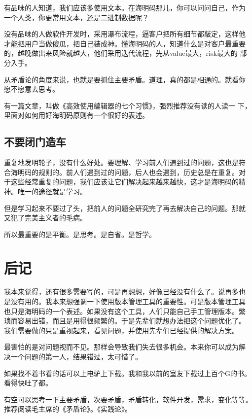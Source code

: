 \documentclass[10pt]{article}
\begin{document}
\begin{CJK*}{UTF8}{simsun}
有品味的人知道，我们应该多使用文本。在海明码那儿，你可以问问自己，作为
一个人类，你更常用文本，还是二进制数据呢？

没有品味的人做软件开发时，采用瀑布流程，逼客户把所有细节都敲定，这样他
才能把用户当做傻瓜，把自己装成神。懂海明码的人，知道什么是对客户最重要
的，越晚做出来风险就越大，他们采用迭代流程，先从value最大，risk最大的
部分入手。

从矛盾论的角度来说，也就是要抓住主要矛盾。道理，真的都是相通的。就看你
愿不愿意去思考。

有一篇文章，叫做《高效使用编辑器的七个习惯》，强烈推荐没有读的人读一
下，里面对如何用好海明码原则有一个很好的表述。

\subsection{不要闭门造车}

重复地发明轮子，没有什么好处。要理解、学习前人们遇到过的问题，这也是符
合海明码的规则的。前人们遇到过的问题，后人也会遇到，历史总是在重复。对
于这些经常重复的问题，我们应该让它们解决起来越来越快，这才是海明码的精
神。唯一的途径就是学习。

但是学习起来不要过了头，把前人的问题全研究完了再去解决自己的问题。那就
又犯了完美主义者的毛病。

所以最重要的是平衡。是思考。是自省。是哲学。

\section{后记}

我本来觉得，还有很多需要写的，可是再想想，好像已经没有什么了。说再多也
是没有用的。我本来想强调一下使用版本管理工具的重要性。可是版本管理工具
也只是海明码的一个表述。如果没有这个工具，人们只能自己手工管理版本。繁
琐而容易出错，而且是用得很频繁的。于是先辈们就想办法把这个问题优化了。
我们需要做的只是重视起来，看见问题，并使用先辈们已经提供的解决方案。

最害怕的是对问题视而不见。那样会导致我们失去很多机会。本来你可以成为解
决一个问题的第一人，结果错过，太可惜了。

如果找不着书看的话可以上电驴上下载。我和我以前的室友下载过上百个G的书。
看得快吐了都。

有空可以思考一下主要矛盾，次要矛盾，矛盾转化，软件开发，需求，变化等等。
推荐阅读毛主席的《矛盾论》。《实践论》。


\end{CJK*}
\end{document}
